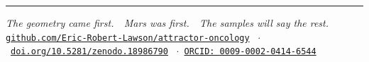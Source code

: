 \documentclass[11pt, a4paper]{article}
\begin{document}
\vspace{1em}
\noindent\textcolor{rulecolor}{\rule{\linewidth}{0.4pt}}
\begin{center}
\footnotesize
\textit{The geometry came first.\ \
Mars was first.\ \
The samples will say the rest.}\\[0.15em]
\href{https://github.com/Eric-Robert-Lawson/attractor-oncology}
{\texttt{github.com/Eric-Robert-Lawson/attractor-oncology}}
\ $\cdot$\
\href{https://doi.org/10.5281/zenodo.18986790}
{\texttt{doi.org/10.5281/zenodo.18986790}}
\ $\cdot$\
\href{https://orcid.org/0009-0002-0414-6544}
{\texttt{ORCID: 0009-0002-0414-6544}}
\end{center}
\end{document}
